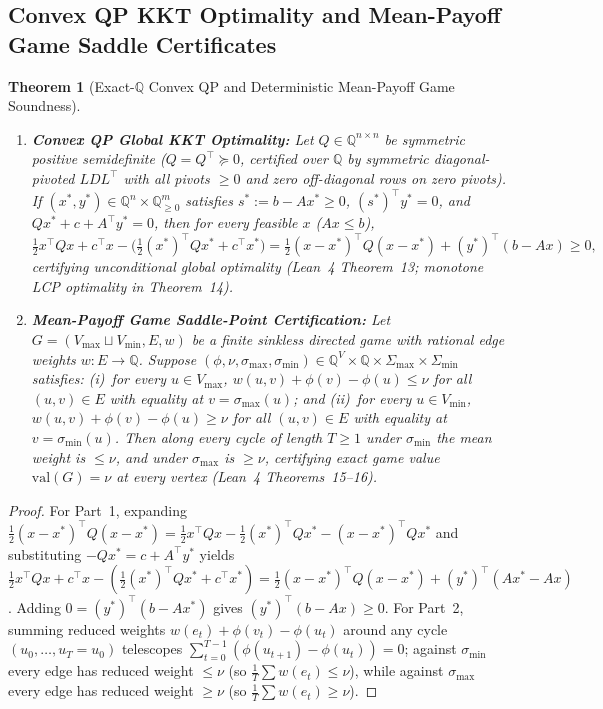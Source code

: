 \documentclass[11pt,a4paper]{article}
\newtheorem{theorem}{Theorem}[section]
\theoremstyle{definition}
\theoremstyle{remark}
\newcommand{\QQ}{\mathbb{Q}}
\begin{document}
\subsection{Convex QP KKT Optimality and Mean-Payoff Game Saddle Certificates}

\begin{theorem}[Exact-$\QQ$ Convex QP and Deterministic Mean-Payoff Game Soundness]\label{thm:qp_mpg}
\begin{enumerate}[leftmargin=1.8em,itemsep=2pt]
  \item \textbf{Convex QP Global KKT Optimality:} Let $Q \in \QQ^{n\times n}$ be symmetric positive semidefinite ($Q = Q^\top \succeq 0$, certified over $\QQ$ by symmetric diagonal-pivoted $LDL^\top$ with all pivots $\ge 0$ and zero off-diagonal rows on zero pivots). If $(x^*, y^*) \in \QQ^n \times \QQ^m_{\ge 0}$ satisfies $s^* := b - Ax^* \ge 0$, $(s^*)^\top y^* = 0$, and $Qx^* + c + A^\top y^* = 0$, then for every feasible $x$ ($Ax \le b$),
  \[
    \tfrac{1}{2}x^\top Q x + c^\top x - \bigl(\tfrac{1}{2}(x^*)^\top Q x^* + c^\top x^*\bigr)
    = \tfrac{1}{2}(x - x^*)^\top Q (x - x^*) + (y^*)^\top (b - Ax) \ge 0,
  \]
  certifying unconditional global optimality (Lean~4 Theorem~13; monotone LCP optimality in Theorem~14).
  \item \textbf{Mean-Payoff Game Saddle-Point Certification:} Let $G = (V_{\max} \sqcup V_{\min}, E, w)$ be a finite sinkless directed game with rational edge weights $w: E \to \QQ$. Suppose $(\phi, \nu, \sigma_{\max}, \sigma_{\min}) \in \QQ^V \times \QQ \times \Sigma_{\max} \times \Sigma_{\min}$ satisfies: (i)~for every $u \in V_{\max}$, $w(u,v) + \phi(v) - \phi(u) \le \nu$ for all $(u,v) \in E$ with equality at $v = \sigma_{\max}(u)$; and (ii)~for every $u \in V_{\min}$, $w(u,v) + \phi(v) - \phi(u) \ge \nu$ for all $(u,v) \in E$ with equality at $v = \sigma_{\min}(u)$. Then along every cycle of length $T \ge 1$ under $\sigma_{\min}$ the mean weight is $\le \nu$, and under $\sigma_{\max}$ is $\ge \nu$, certifying exact game value $\mathrm{val}(G) = \nu$ at every vertex (Lean~4 Theorems~15--16).
\end{enumerate}
\end{theorem}

\begin{proof}
For Part~1, expanding $\frac{1}{2}(x-x^*)^\top Q(x-x^*) = \frac{1}{2}x^\top Qx - \frac{1}{2}(x^*)^\top Qx^* - (x - x^*)^\top Q x^*$ and substituting $-Q x^* = c + A^\top y^*$ yields $\frac{1}{2}x^\top Qx + c^\top x - (\frac{1}{2}(x^*)^\top Q x^* + c^\top x^*) = \frac{1}{2}(x - x^*)^\top Q(x - x^*) + (y^*)^\top(Ax^* - Ax)$. Adding $0 = (y^*)^\top(b - Ax^*)$ gives $(y^*)^\top(b - Ax) \ge 0$. For Part~2, summing reduced weights $w(e_t) + \phi(v_t) - \phi(u_t)$ around any cycle $(u_0,\dots,u_T=u_0)$ telescopes $\sum_{t=0}^{T-1}(\phi(u_{t+1}) - \phi(u_t)) = 0$; against $\sigma_{\min}$ every edge has reduced weight $\le \nu$ (so $\frac{1}{T}\sum w(e_t) \le \nu$), while against $\sigma_{\max}$ every edge has reduced weight $\ge \nu$ (so $\frac{1}{T}\sum w(e_t) \ge \nu$).
\end{proof}
\end{document}
